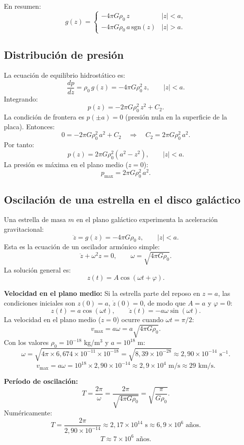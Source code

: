 En resumen:
$$
\boxed{g(z) = \begin{cases} -4\pi G\rho_0\,z & |z| < a, \\[6pt] -4\pi G\rho_0\,a\,\text{sgn}(z) & |z| > a. \end{cases}}
$$

\subsection{Distribución de presión}

La ecuación de equilibrio hidrostático es:
$$
\frac{dp}{dz} = \rho_0\,g(z) = -4\pi G\rho_0^2\,z, \qquad |z| < a.
$$
Integrando:
$$
p(z) = -2\pi G\rho_0^2\,z^2 + C_2.
$$
La condición de frontera es $p(\pm a) = 0$ (presión nula en la superficie de la placa). Entonces:
$$
0 = -2\pi G\rho_0^2\,a^2 + C_2 \quad \Longrightarrow \quad C_2 = 2\pi G\rho_0^2\,a^2.
$$
Por tanto:
$$
\boxed{p(z) = 2\pi G\rho_0^2\left(a^2 - z^2\right), \qquad |z| < a.}
$$
La presión es máxima en el plano medio ($z = 0$):
$$
p_{\text{max}} = 2\pi G\rho_0^2\,a^2.
$$

\subsection{Oscilación de una estrella en el disco galáctico}

Una estrella de masa $m$ en el plano galáctico experimenta la aceleración gravitacional:
$$
\ddot{z} = g(z) = -4\pi G\rho_0\,z, \qquad |z| < a.
$$
Esta es la ecuación de un oscilador armónico simple:
$$
\ddot{z} + \omega^2 z = 0, \qquad \omega = \sqrt{4\pi G\rho_0}.
$$
La solución general es:
$$
z(t) = A\cos(\omega t + \varphi).
$$

\textbf{Velocidad en el plano medio:} Si la estrella parte del reposo en $z = a$, las condiciones iniciales son $z(0) = a$, $\dot{z}(0) = 0$, de modo que $A = a$ y $\varphi = 0$:
$$
z(t) = a\cos(\omega t), \qquad \dot{z}(t) = -a\omega\sin(\omega t).
$$
La velocidad en el plano medio ($z = 0$) ocurre cuando $\omega t = \pi/2$:
$$
v_{\text{max}} = a\omega = a\sqrt{4\pi G\rho_0}.
$$
Con los valores $\rho_0 = 10^{-18}$ kg/m$^3$ y $a = 10^{18}$ m:
$$
\omega = \sqrt{4\pi \times 6{,}674\times 10^{-11}\times 10^{-18}} = \sqrt{8{,}39\times 10^{-28}} \approx 2{,}90\times 10^{-14} \text{ s}^{-1}.
$$
$$
\boxed{v_{\text{max}} = a\omega = 10^{18}\times 2{,}90\times 10^{-14} \approx 2{,}9\times 10^4 \text{ m/s} \approx 29 \text{ km/s}.}
$$

\textbf{Período de oscilación:}
$$
T = \frac{2\pi}{\omega} = \frac{2\pi}{\sqrt{4\pi G\rho_0}} = \sqrt{\frac{\pi}{G\rho_0}}.
$$
Numéricamente:
$$
T = \frac{2\pi}{2{,}90\times 10^{-14}} \approx 2{,}17\times 10^{14} \text{ s} \approx 6{,}9\times 10^6 \text{ años}.
$$
$$
\boxed{T \approx 7\times 10^6 \text{ años}.}
$$

